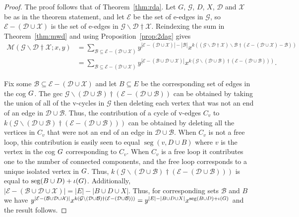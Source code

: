 \documentclass[10pt,a4paper]{amsart}
\DeclareMathOperator{\seg}{seg}
\newcommand{\ba}{\mathbin{\backslash}}
\newcommand{\calM}{\mathcal{M}}
\newcommand{\cog}[1]{\textbf{\textit #1}}
\newcommand{\ext}{\mathbin{\dagger}}
\newcommand{\gec}[1]{\mathcal{#1}}
\begin{document}
\begin{proof}
The proof follows that of Theorem~\ref{thm:rda}.
Let $G$, $\gec{G}$,  $D$, $X$, $\gec{D}$ and $\gec{X}$ be as in the theorem statement, and let $\mathcal{E}$ be the set of e-edges in $\gec{G}$, so $\mathcal{E}-(\gec{D}\cup \gec{X})$ is the set of e-edges in $\gec{G}\ba \gec{D}\ext \gec{X}$. 
Reindexing the sum in Theorem~\ref{thm:mwd} and using Proposition~\ref{prop:2dag} gives  
\begin{align*}
\calM(\gec{G}\ba \gec{D}\ext \gec{X};x,y) 
&= \sum_{\mathcal{B} \subseteq \mathcal{E}-(\gec{D}\cup \gec{X})} y^{|\mathcal{E}-(\gec{D}\cup \gec{X})|-|\mathcal{B}|}x^{k((\gec{G}\ba \gec{D}\ext \gec{X})\ba \mathcal{B} \ext (\mathcal{E}-(\gec{D}\cup \gec{X})-\mathcal{B}))}
\\
&=
\sum_{\mathcal{B} \subseteq \mathcal{E}-(\gec{D}\cup \gec{X})} 
y^{|\mathcal{E}-(\mathcal{B}\cup \gec{D}\cup \gec{X})|}
x^{k(\gec{G}\ba (\gec{D}\cup \gec{B}) \ext (\gec{E}-(\gec{D}\cup \gec{B})))}
.
\end{align*}

Fix some $\mathcal{B} \subseteq \mathcal{E}-(\gec{D}\cup \gec{X})$ and let $B\subseteq E$ be the corresponding set of edges in the cog $\cog{G}$. 
The gec
$\gec{G}\ba (\gec{D}\cup\mathcal{B}) \ext (\mathcal{E}-(\gec{D}\cup\mathcal{B}))$ can be obtained by taking the union of all of the v-cycles in $\gec{G}$ then deleting each vertex that was not an end of an edge in $\gec{D}\cup\mathcal{B}$. 
Thus, the contribution of a cycle of v-edges $C_v$ to $k(\gec{G}\ba (\gec{D}\cup\mathcal{B}) \ext (\mathcal{E}-(\gec{D}\cup\mathcal{B})))$ can be obtained by deleting all the vertices in $C_v$ that were not an end of an edge in $\gec{D}\cup\mathcal{B}$. When $C_v$ is not a free loop, this contribution is easily seen to equal $\seg(v,D\cup B)$ where $v$ is the vertex in the cog $\cog{G}$ corresponding to $C_v$. 
When $C_v$ is a free loop it contributes one to the number of connected components, and the free loop corresponds to a unique isolated vertex in
$\cog{G}$.
Thus, 
$k(\gec{G}\ba (\gec{D}\cup\mathcal{B}) \ext (\mathcal{E}-(\gec{D}\cup\mathcal{B})))$ 
is equal to 
$\seg(B\cup D)+\iota(\cog{G})$. 
Additionally,  $|\mathcal{E}-(\mathcal{B}\cup \gec{D}\cup \gec{X})| = |E|-|B\cup D\cup X|$.
Thus, for corresponding sets $\gec{B}$ and $B$ we have  
$y^{|\mathcal{E}-(\mathcal{B}\cup \gec{D}\cup \gec{X})|}
x^{k(\gec{G}\ba (\gec{D}\cup \gec{B}) \ext (\gec{E}-(\gec{D}\cup \gec{B})))}
=
 y^{|E|-|B\cup D\cup X|} x^{\seg(B\cup D)+\iota(\cog{G})}$ and
the result follows.
\end{proof}
\end{document}
